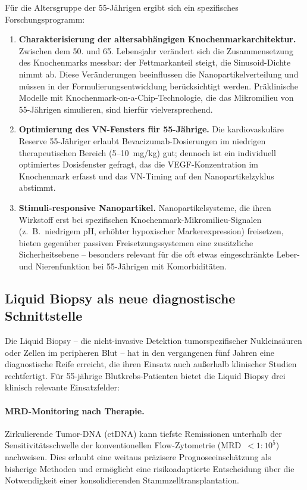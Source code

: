 ﻿\documentclass[12pt,a4paper]{article}
\theoremstyle{definition}
\begin{document}
Für die Altersgruppe der 55-Jährigen ergibt sich ein spezifisches Forschungsprogramm:
\begin{enumerate}
  \item \textbf{Charakterisierung der altersabhängigen Knochenmarkarchitektur.}
        Zwischen dem 50. und 65. Lebensjahr verändert sich die Zusammensetzung des
        Knochenmarks messbar: der Fettmarkanteil steigt, die Sinusoid-Dichte nimmt ab.
        Diese Veränderungen beeinflussen die Nanopartikelverteilung und müssen in der
        Formulierungsentwicklung berücksichtigt werden. Präklinische Modelle mit
        Knochenmark-on-a-Chip-Technologie, die das Mikromilieu von 55-Jährigen simulieren,
        sind hierfür vielversprechend.
  \item \textbf{Optimierung des VN-Fensters für 55-Jährige.}
        Die kardiovaskuläre Reserve 55-Jähriger erlaubt Bevacizumab-Dosierungen im
        niedrigen therapeutischen Bereich (5--10~mg/kg) gut; dennoch ist ein individuell
        optimiertes Dosisfenster gefragt, das die VEGF-Konzentration im Knochenmark
        erfasst und das VN-Timing auf den Nanopartikelzyklus abstimmt.
  \item \textbf{Stimuli-responsive Nanopartikel.}
        Nanopartikelsysteme, die ihren Wirkstoff erst bei spezifischen Knochenmark-Mikromilieu-Signalen
        (z.~B.\ niedrigem pH, erhöhter hypoxischer Markerexpression) freisetzen,
        bieten gegenüber passiven Freisetzungssystemen eine zusätzliche Sicherheitsebene
        -- besonders relevant für die oft etwas eingeschränkte Leber- und Nierenfunktion
        bei 55-Jährigen mit Komorbiditäten.
\end{enumerate}

\subsection{Liquid Biopsy als neue diagnostische Schnittstelle}

Die Liquid Biopsy -- die nicht-invasive Detektion tumorspezifischer Nukleinsäuren oder
Zellen im peripheren Blut -- hat in den vergangenen fünf Jahren eine diagnostische
Reife erreicht, die ihren Einsatz auch außerhalb klinischer Studien rechtfertigt.
Für 55-jährige Blutkrebs-Patienten bietet die Liquid Biopsy drei klinisch relevante
Einsatzfelder:

\paragraph{MRD-Monitoring nach Therapie.}
Zirkulierende Tumor-DNA (ctDNA) kann tiefste Remissionen unterhalb der
Sensitivitätsschwelle der konventionellen Flow-Zytometrie (MRD~$<1{:}10^5$)
nachweisen. Dies erlaubt eine weitaus präzisere Prognoseeinsch\-ätzung als bisherige
Methoden und ermöglicht eine risikoadaptierte Entscheidung über die Notwendigkeit
einer konsolidierenden Stammzelltransplantation.
\end{document}
